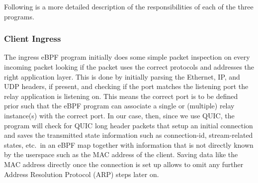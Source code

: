 Following is a more detailed description of the responsibilities of each of the three programs.
\subsubsection{Client Ingress} 
The ingress eBPF program initially does some simple packet inspection on every incoming packet 
looking if the packet uses the correct protocols and addresses the right application layer.
This is done by initially parsing the Ethernet, IP, and UDP headers, if present, and checking if 
the port matches the listening port the relay application is listening on.
This means the correct port is to be defined prior such that the eBPF program can associate 
a single or (multiple) relay instance(s) with the correct port.
In our case, then, since we use QUIC, the program will check for QUIC long header packets that 
setup an initial connection and saves the transmitted state information such as connection-id, 
stream-related states, etc.~in an eBPF map together with information that is not directly known
by the userspace such as the MAC address of the client.
Saving data like the MAC address directly once the connection is set up allows to omit any further 
Address Resolution Protocol (ARP) steps later on. 

